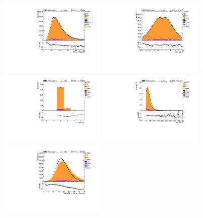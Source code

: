 \begin{figure}
  \centering
  \includegraphics[width=0.45\textwidth]{fig/app4/muon/Pt_bJet1.pdf}
  \includegraphics[width=0.45\textwidth]{fig/app4/muon/Eta_bJet1.pdf} \\
  \includegraphics[width=0.45\textwidth]{fig/app4/muon/n_bJets_aft.pdf}
  \includegraphics[width=0.45\textwidth]{fig/app4/muon/M_T_aft.pdf}
  \includegraphics[width=0.45\textwidth]{fig/app4/muon/EvtInfo_NumVtx.pdf}

\end{figure}
